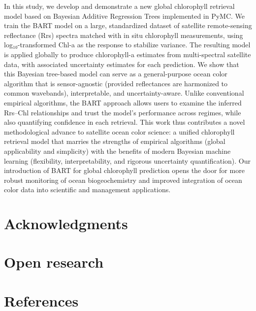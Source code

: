 \documentclass[
]{agujournal2019}
\begin{document}
In this study, we develop and demonstrate a new global chlorophyll
retrieval model based on Bayesian Additive Regression Trees implemented
in PyMC. We train the BART model on a large, standardized dataset of
satellite remote-sensing reflectance (Rrs) spectra matched with in situ
chlorophyll measurements, using log₁₀-transformed Chl-a as the response
to stabilize variance. The resulting model is applied globally to
produce chlorophyll-a estimates from multi-spectral satellite data, with
associated uncertainty estimates for each prediction. We show that this
Bayesian tree-based model can serve as a general-purpose ocean color
algorithm that is sensor-agnostic (provided reflectances are harmonized
to common wavebands), interpretable, and uncertainty-aware. Unlike
conventional empirical algorithms, the BART approach allows users to
examine the inferred Rrs--Chl relationships and trust the model's
performance across regimes, while also quantifying confidence in each
retrieval. This work thus contributes a novel methodological advance to
satellite ocean color science: a unified chlorophyll retrieval model
that marries the strengths of empirical algorithms (global applicability
and simplicity) with the benefits of modern Bayesian machine learning
(flexibility, interpretability, and rigorous uncertainty
quantification). Our introduction of BART for global chlorophyll
prediction opens the door for more robust monitoring of ocean
biogeochemistry and improved integration of ocean color data into
scientific and management applications.

\section{Acknowledgments}\label{acknowledgments}

\section{Open research}\label{open-research}

\section*{References}\label{references}
\end{document}
